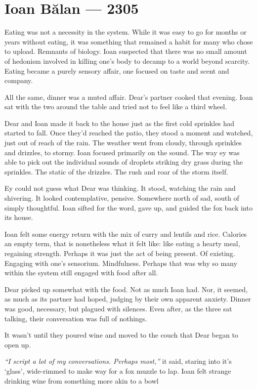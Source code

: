\hypertarget{ioan-bux103lan-2305}{%
\chapter*{Ioan Bălan — 2305}\label{ioan-bux103lan-2305}}

Eating was not a necessity in the system. While it was easy to go for months or years without eating, it was something that remained a habit for many who chose to upload. Remnants of biology. Ioan suspected that there was no small amount of hedonism involved in killing one's body to decamp to a world beyond scarcity. Eating became a purely sensory affair, one focused on taste and scent and company.

All the same, dinner was a muted affair. Dear's partner cooked that evening. Ioan sat with the two around the table and tried not to feel like a third wheel.

Dear and Ioan made it back to the house just as the first cold sprinkles had started to fall. Once they'd reached the patio, they stood a moment and watched, just out of reach of the rain. The weather went from cloudy, through sprinkles and drizzles, to stormy. Ioan focused primarily on the sound. The way ey was able to pick out the individual sounds of droplets striking dry grass during the sprinkles. The static of the drizzles. The rush and roar of the storm itself.

Ey could not guess what Dear was thinking. It stood, watching the rain and shivering. It looked contemplative, pensive. Somewhere north of sad, south of simply thoughtful. Ioan sifted for the word, gave up, and guided the fox back into its house.

Ioan felt some energy return with the mix of curry and lentils and rice. Calories an empty term, that is nonetheless what it felt like: like eating a hearty meal, regaining strength. Perhaps it was just the act of being present. Of existing. Engaging with one's sensorium. Mindfulness. Perhaps that was why so many within the system still engaged with food after all.

Dear picked up somewhat with the food. Not as much Ioan had. Nor, it seemed, as much as its partner had hoped, judging by their own apparent anxiety. Dinner was good, necessary, but plagued with silences. Even after, as the three sat talking, their conversation was full of nothings.

It wasn't until they poured wine and moved to the couch that Dear began to open up.

\emph{``I script a lot of my conversations. Perhaps most,''} it said, staring into it's `glass', wide-rimmed to make way for a fox muzzle to lap. Ioan felt strange drinking wine from something more akin to a bowl

